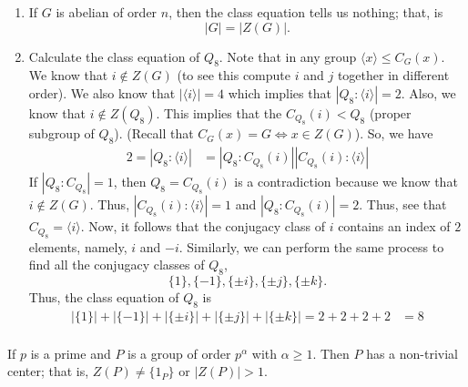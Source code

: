 \begin{eg}
   \begin{enumerate}
       \item[(1)] If \( G  \) is abelian of order \( n  \), then the class equation tells us nothing; that, is
           \[  | G  |  = | Z(G) |. \]
        \item[(2)] Calculate the class equation of \( {Q}_{8} \). Note that in any group \( \langle  x  \rangle \leq {C}_{G}(x) \). We know that \( i \notin Z(G) \) (to see this compute \( i \) and \( j  \) together in different order). We also know that \( | \langle  i \rangle |  = 4  \) which implies that \( | {Q}_{8} : \langle  i  \rangle |  = 2  \). Also, we know that \( i \notin Z({Q}_{8}) \). This implies that the \( {C}_{{Q}_{8}}(i) < {Q}_{8}  \) (proper subgroup of \( {Q}_{8} \)). (Recall that \( {C}_{G}(x)  = G \iff x \in Z(G) \)). So, we have 
            \begin{align*}
                2 = | {Q}_{8} : \langle  i \rangle | &= | {Q}_{8} : {C}_{{Q}_{8}}(i)  |  | {C}_{{Q}_{8}}(i) : \langle i   \rangle    |
            \end{align*}
            If \( | {Q}_{8} : {C}_{{Q}_{8}} |  = 1  \), then \( {Q}_{8} = {C}_{{Q}_{8}}(i) \) is a contradiction because we know that \( i \notin Z(G) \). Thus, \( | {C}_{{Q}_{8}}(i) : \langle  i   \rangle |  = 1  \) and \( | {Q}_{8} : {C}_{{Q}_{8}}(i) | = 2  \). Thus, see that \( {C}_{{Q}_{8}} = \langle  i \rangle \). Now, it follows that the conjugacy class of \( i  \) contains an index of \( 2  \) elements, namely, \( i  \) and \( - i  \). Similarly, we can perform the same process to find all the conjugacy classes of \( {Q}_{8} \), 
            \[  \{  1  \} , \{  - 1  \} , \{  \pm i  \} , \{  \pm j  \} , \{  \pm k  \}. \]
            Thus, the class equation of \( {Q}_{8} \) is
            \begin{align*}
                | \{ 1  \}  |  + | \{  - 1  \}  |  + | \{  \pm i  \}   |  + | \{  \pm j  \}  |  + | \{  \pm k \}  |  =  2 + 2  +2 + 2 &= 8  \\
            \end{align*}
   \end{enumerate} 
\end{eg}

\begin{theorem}[ ]
    If \( p  \) is a prime and \( P  \) is a group of order \( p^{\alpha} \) with \( \alpha \geq 1  \). Then \( P  \) has a non-trivial center; that is, \( Z(P) \neq \{ {1 }_{P} \}   \) or \( | Z(P) |  > 1  \). 
\end{theorem}

